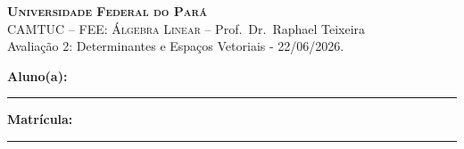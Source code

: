 \documentclass[12pt, addpoints]{exam}
\begin{document}
\begin{center}
    \textsc{\textbf{Universidade Federal do Pará} \\
    CAMTUC -- FEE: Álgebra Linear} -- Prof.\ Dr.\ Raphael Teixeira \\
    \vspace{0.1cm}
    Avaliação 2: Determinantes e Espaços Vetoriais \hspace{0.6cm}-\hspace{0.6cm} 22/06/2026.
\end{center}
\vspace{0.3cm}
\noindent
\textbf{Aluno(a):} \rule{8cm}{0.1pt} \quad \textbf{Matrícula:} \rule{3.5cm}{0.1pt}
\vspace{0.0cm}
\end{document}
